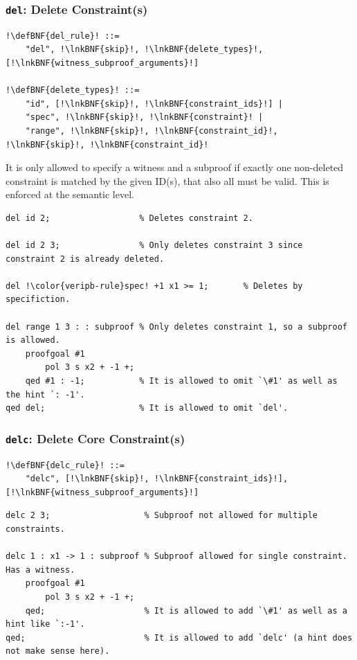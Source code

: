 \documentclass[a4paper]{article}
\newcommand{\defBNF}[1]{\hypertarget{def:#1}{<\detokenize{#1}>}}
\newcommand{\lnkBNF}[1]{\hyperlink{def:#1}{<\detokenize{#1}>}}
\begin{document}
\subsubsection{\texttt{del}: Delete Constraint(s)}\label{sec:rules-del}
\begin{lstlisting}
!\defBNF{del_rule}! ::=
	"del", !\lnkBNF{skip}!, !\lnkBNF{delete_types}!, [!\lnkBNF{witness_subproof_arguments}!]

!\defBNF{delete_types}! ::=
	"id", [!\lnkBNF{skip}!, !\lnkBNF{constraint_ids}!] |
	"spec", !\lnkBNF{skip}!, !\lnkBNF{constraint}! |
	"range", !\lnkBNF{skip}!, !\lnkBNF{constraint_id}!, !\lnkBNF{skip}!, !\lnkBNF{constraint_id}!
\end{lstlisting}
It is only allowed to specify a witness and a subproof if exactly one non-deleted constraint is matched by the given ID(s), that also all must be valid. This is enforced at the semantic level.
\begin{lstlisting}[language=veripb]
del id 2;                  % Deletes constraint 2.

del id 2 3;                % Only deletes constraint 3 since constraint 2 is already deleted.

del !\color{veripb-rule}spec! +1 x1 >= 1;       % Deletes by specifiction.

del range 1 3 : : subproof % Only deletes constraint 1, so a subproof is allowed.
	proofgoal #1
		pol 3 s x2 + -1 +;
	qed #1 : -1;           % It is allowed to omit `\#1' as well as the hint `: -1'.
qed del;                   % It is allowed to omit `del'.
\end{lstlisting}


\subsubsection{\texttt{delc}: Delete Core Constraint(s)}\label{sec:rules-delc}
\begin{lstlisting}
!\defBNF{delc_rule}! ::=
	"delc", [!\lnkBNF{skip}!, !\lnkBNF{constraint_ids}!], [!\lnkBNF{witness_subproof_arguments}!]
\end{lstlisting}
\begin{lstlisting}[language=veripb]
delc 2 3;                   % Subproof not allowed for multiple constraints.

delc 1 : x1 -> 1 : subproof % Subproof allowed for single constraint. Has a witness.
	proofgoal #1
		pol 3 s x2 + -1 +;
	qed;                    % It is allowed to add `\#1' as well as a hint like `:-1'.
qed;                        % It is allowed to add `delc' (a hint does not make sense here).
\end{lstlisting}
\end{document}
